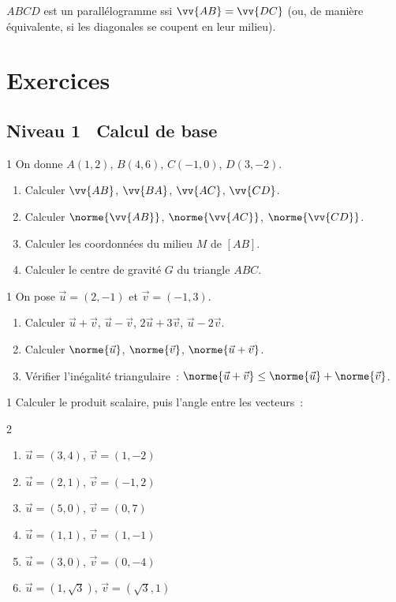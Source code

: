 \begin{methode}
$ABCD$ est un parall\'elogramme ssi $\vv{AB} = \vv{DC}$
(ou, de mani\`ere \'equivalente, si les diagonales se coupent en leur milieu).
\end{methode}

\section{Exercices}

\subsection*{\quad Niveau 1 \textemdash\ Calcul de base}

\begin{exo}{1}
On donne $A(1,2)$, $B(4,6)$, $C(-1,0)$, $D(3,-2)$.
\begin{enumerate}
  \item Calculer $\vv{AB}$, $\vv{BA}$, $\vv{AC}$, $\vv{CD}$.
  \item Calculer $\norme{\vv{AB}}$, $\norme{\vv{AC}}$, $\norme{\vv{CD}}$.
  \item Calculer les coordonn\'ees du milieu $M$ de $[AB]$.
  \item Calculer le centre de gravit\'e $G$ du triangle $ABC$.
\end{enumerate}
\end{exo}

\begin{exo}{1}
On pose $\vec{u}=(2,-1)$ et $\vec{v}=(-1,3)$.
\begin{enumerate}
  \item Calculer $\vec{u}+\vec{v}$, $\vec{u}-\vec{v}$,
        $2\vec{u}+3\vec{v}$, $\vec{u}-2\vec{v}$.
  \item Calculer $\norme{\vec{u}}$, $\norme{\vec{v}}$,
        $\norme{\vec{u}+\vec{v}}$.
  \item V\'erifier l'in\'egalit\'e triangulaire~:
        $\norme{\vec{u}+\vec{v}} \leq \norme{\vec{u}}+\norme{\vec{v}}$.
\end{enumerate}
\end{exo}

\begin{exo}{1}
Calculer le produit scalaire, puis l'angle entre les vecteurs~:
\begin{multicols}{2}
\begin{enumerate}
  \item $\vec{u}=(3,4)$, $\vec{v}=(1,-2)$
  \item $\vec{u}=(2,1)$, $\vec{v}=(-1,2)$
  \item $\vec{u}=(5,0)$, $\vec{v}=(0,7)$
  \item $\vec{u}=(1,1)$, $\vec{v}=(1,-1)$
  \item $\vec{u}=(3,0)$, $\vec{v}=(0,-4)$
  \item $\vec{u}=(1,\sqrt{3})$, $\vec{v}=(\sqrt{3},1)$
\end{enumerate}
\end{multicols}
\end{exo}

